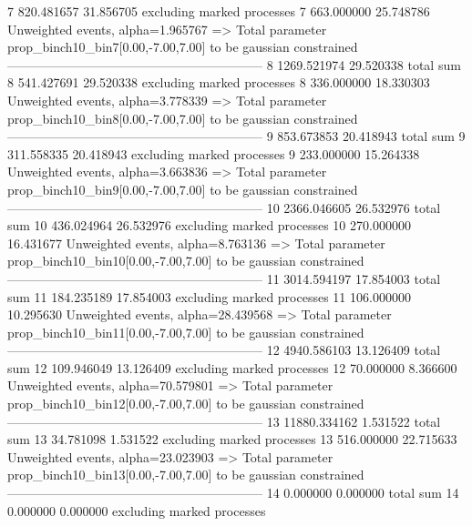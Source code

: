 7          820.481657      31.856705       excluding marked processes    
7          663.000000      25.748786       Unweighted events, alpha=1.965767
  => Total parameter prop_binch10_bin7[0.00,-7.00,7.00] to be gaussian constrained
------------------------------------------------------------
8          1269.521974     29.520338       total sum                     
8          541.427691      29.520338       excluding marked processes    
8          336.000000      18.330303       Unweighted events, alpha=3.778339
  => Total parameter prop_binch10_bin8[0.00,-7.00,7.00] to be gaussian constrained
------------------------------------------------------------
9          853.673853      20.418943       total sum                     
9          311.558335      20.418943       excluding marked processes    
9          233.000000      15.264338       Unweighted events, alpha=3.663836
  => Total parameter prop_binch10_bin9[0.00,-7.00,7.00] to be gaussian constrained
------------------------------------------------------------
10         2366.046605     26.532976       total sum                     
10         436.024964      26.532976       excluding marked processes    
10         270.000000      16.431677       Unweighted events, alpha=8.763136
  => Total parameter prop_binch10_bin10[0.00,-7.00,7.00] to be gaussian constrained
------------------------------------------------------------
11         3014.594197     17.854003       total sum                     
11         184.235189      17.854003       excluding marked processes    
11         106.000000      10.295630       Unweighted events, alpha=28.439568
  => Total parameter prop_binch10_bin11[0.00,-7.00,7.00] to be gaussian constrained
------------------------------------------------------------
12         4940.586103     13.126409       total sum                     
12         109.946049      13.126409       excluding marked processes    
12         70.000000       8.366600        Unweighted events, alpha=70.579801
  => Total parameter prop_binch10_bin12[0.00,-7.00,7.00] to be gaussian constrained
------------------------------------------------------------
13         11880.334162    1.531522        total sum                     
13         34.781098       1.531522        excluding marked processes    
13         516.000000      22.715633       Unweighted events, alpha=23.023903
  => Total parameter prop_binch10_bin13[0.00,-7.00,7.00] to be gaussian constrained
------------------------------------------------------------
14         0.000000        0.000000        total sum                     
14         0.000000        0.000000        excluding marked processes    
